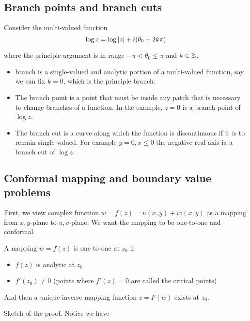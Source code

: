 \documentclass{article}
\begin{document}
\subsection{Branch points and branch cuts}

Consider the multi-valued function 
\[\log z = \log \left\vert z\right\vert + i(\theta_0+2k\pi)\]

where the principle argument is in range \(-\pi < \theta_0 \leq \pi \) and \(k\in\mathbb{Z}\).

\begin{definition}[branch]
    \begin{itemize}
        \item branch is a single-valued and analytic portion of a multi-valued function, say we can fix \(k=0\), which is the principle branch.
        \item  The branch point is a point that must be inside any patch that is necessary to change branches of a function. In the example, \(z=0\) is a branch point of \(\log z\).
        \item The branch cut is a curve along which the function is discontinuous if it is to remain single-valued. For example \(y=0, x\leq 0\) the negative real axis ia a branch cut of \(\log z\).
    \end{itemize}
\end{definition}

\subsection{Conformal mapping and boundary value problems}

First, we view complex function \(w=f(z)=u(x,y)+iv(x,y)\) as a mapping from \(x,y\)-plane to \(u,v\)-plane. We want the mapping to be one-to-one and conformal.

\begin{theorem}
    A mapping \(w=f(z)\) is one-to-one at \(z_0\) if 
    \begin{itemize}
        \item \(f(z)\) is analytic at \(z_0\) 
        \item \(f'(z_0) \neq 0\) (points where \(f'(z)=0\) are called the critical points)
    \end{itemize}
    And then a unique inverse mapping function \(z=F(w)\) exists at \(z_0\).
\end{theorem}

Sketch of the proof. Notice we have
\end{document}
